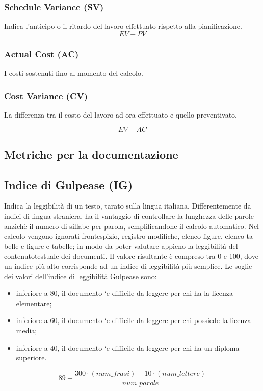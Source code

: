 \subsubsection{Schedule Variance (SV)}
Indica l'anticipo o il ritardo del lavoro effettuato rispetto alla pianificazione.
\[
    EV - PV
\]

\subsubsection{Actual Cost (AC)}
I costi sostenuti fino al momento del calcolo.

\subsubsection{Cost Variance (CV)}
La differenza tra il costo del lavoro ad ora effettuato e quello preventivato.

\[
    EV-AC
\]

\subsection{Metriche per la documentazione}

\subsection{Indice di Gulpease (IG)}
Indica la leggibilità di un testo, tarato sulla lingua italiana. Differentemente da indici di lingua straniera, ha il vantaggio di controllare la lunghezza delle parole anzichè il numero di sillabe per parola, semplificandone il calcolo automatico. 
Nel calcolo vengono ignorati frontespizio, registro modifiche, elenco figure, elenco ta-belle e figure e tabelle; in modo da poter valutare appieno la leggibilità del contenutotestuale dei documenti.
Il valore risultante è compreso tra 0 e 100, dove un indice più alto corrisponde ad un indice di leggibilità più semplice.
Le soglie dei valori dell’indice di leggibilità Gulpease sono:
\begin{itemize}
    \item inferiore a 80, il documento `e difficile da leggere per chi ha la licenza elementare;
    \item inferiore a 60, il documento `e difficile da leggere per chi possiede la licenza media;
    \item inferiore a 40, il documento `e difficile da leggere per chi ha un diploma superiore.
\end{itemize}
\[
    89+ \frac{300\cdot (num\_frasi) - 10\cdot (num\_lettere)}{num\_parole}
\]

